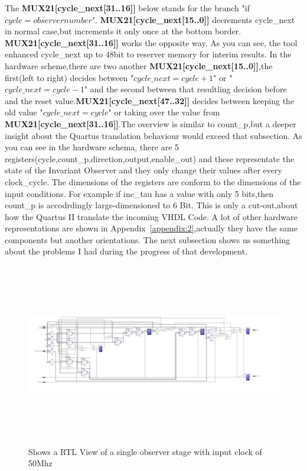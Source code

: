 The \textbf{MUX21[cycle\_next[31..16]]} below stands for the branch "if $cycle=observernumber$".
\textbf{MUX21[cycle\_next[15..0]]} decrements cycle\_next in normal case,but increments it only once at the bottom border. 
\textbf{MUX21[cycle\_next[31..16]]} works the opposite way.
As you can see, the tool enhanced cycle\_next up to 48bit to reserver memory for 
interim results. \newline
In the hardware scheme,there are two another \textbf{MUX21[cycle\_next[15..0]]},the first(left to right) decides between  "$cycle\_next=cycle+1$" or "$cycle\_next=cycle-1$" and the second 
between that resultling decision before and the reset value.\textbf{MUX21[cycle\_next[47..32]]} decides between keeping the old value "$cycle\_next=cycle$" or 
taking over the value from \textbf{MUX21[cycle\_next[31..16]]}.The overview is similar to count\_p,but a deeper insight about the Quartus translation behaviour would exceed that subsection.
As you can see in the hardware schema, there are 5 registers(cycle,count\_p,direction,output,enable\_out) and these representate the state of the Invariant Observer and they only change their values
after every clock\_cycle. 
The dimensions of the registers are conform to the dimensions of the input conditions.
For example if inc\_tau has a value with only 5 bits,then count\_p is accodrdingly large-dimensioned to 6 Bit. 
This is only a cut-out,about how the Quartus II translate the incoming VHDL Code.
A lot of other hardware representations are shown in Appendix~\ref{appendix:2},actually they have the same components but another orientations.
The next subsection shows us something about the problems I had during the progress of that development.

\begin{figure}[]
\centering
\includegraphics[width=650px,height=300px,angle=-90]{../../pictures/22.02.2014/onlyObserver/OBS_50M.jpg}
\caption[RTL View of Observer 0 with clock 50Mhz]{Shows a RTL View of a single observer stage with input clock of 50Mhz}
\label{fig:test:only:50:obs0}
\end{figure}


